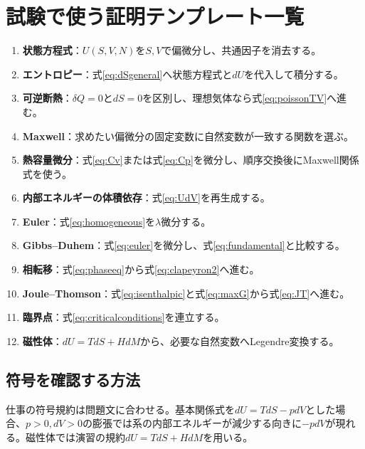 \documentclass[platex,dvipdfmx,a4paper,10pt]{jsarticle}
\begin{document}
\newpage
\section{試験で使う証明テンプレート一覧}\label{sec:templates}
\begin{enumerate}
  \item \textbf{状態方程式}：$U(S,V,N)$を$S,V$で偏微分し、共通因子を消去する。
  \item \textbf{エントロピー}：式\eqref{eq:dSgeneral}へ状態方程式と$dU$を代入して積分する。
  \item \textbf{可逆断熱}：$\delta Q=0$と$dS=0$を区別し、理想気体なら式\eqref{eq:poissonTV}へ進む。
  \item \textbf{Maxwell}：求めたい偏微分の固定変数に自然変数が一致する関数を選ぶ。
  \item \textbf{熱容量微分}：式\eqref{eq:Cv}または式\eqref{eq:Cp}を微分し、順序交換後にMaxwell関係式を使う。
  \item \textbf{内部エネルギーの体積依存}：式\eqref{eq:UdV}を再生成する。
  \item \textbf{Euler}：式\eqref{eq:homogeneous}を$\lambda$微分する。
  \item \textbf{Gibbs--Duhem}：式\eqref{eq:euler}を微分し、式\eqref{eq:fundamental}と比較する。
  \item \textbf{相転移}：式\eqref{eq:phaseeq}から式\eqref{eq:clapeyron2}へ進む。
  \item \textbf{Joule--Thomson}：式\eqref{eq:isenthalpic}と式\eqref{eq:maxG}から式\eqref{eq:JT}へ進む。
  \item \textbf{臨界点}：式\eqref{eq:criticalconditions}を連立する。
  \item \textbf{磁性体}：$dU=TdS+HdM$から、必要な自然変数へLegendre変換する。
\end{enumerate}

\subsection{符号を確認する方法}
仕事の符号規約は問題文に合わせる。基本関係式を$dU=TdS-pdV$とした場合、$p>0,dV>0$の膨張では系の内部エネルギーが減少する向きに$-pdV$が現れる。磁性体では演習の規約$dU=TdS+HdM$を用いる。

\newpage
\end{document}
